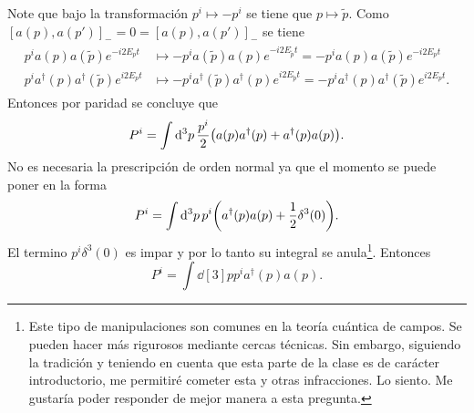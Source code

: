 \documentclass{article}
\begin{document}
Note que bajo la transformación $p^i\mapsto-p^i$ se tiene que $p\mapsto\tilde{p}$. Como $[a(p),a(p')]_-=0=[a(p),a(p')]_-$ se tiene
\begin{align}
\begin{split}
p^ia(p)a(\tilde{p})e^{-i2E_pt}&\mapsto-p^ia(\tilde{p})a(p)e^{-i2E_{\tilde{p}}t}=-p^ia(p)a(\tilde{p})e^{-i2E_pt}\\
p^ia^\dagger(p)a^\dagger(\tilde{p})e^{i2E_pt}&\mapsto-p^ia^\dagger(\tilde{p})a^\dagger(p)e^{i2E_{\tilde{p}}t}=-p^ia^\dagger(p)a^\dagger(\tilde{p})e^{i2E_pt}.
\end{split}
\end{align} 
Entonces por paridad se concluye que
\begin{equation}
P^i=\int\dd[3]{p}\frac{p^i}{2}\qty(a(p)a^\dagger(p)+a^\dagger(p)a(p)).
\end{equation}
No es necesaria la prescripción de orden normal  ya que el momento se puede poner en la forma
\begin{equation}
P^i=\int\dd[3]{p}p^i\qty(a^\dagger(p)a(p)+\frac{1}{2}\delta^3(0)).
\end{equation}
El termino $p^i\delta^3(0)$ es impar y por lo tanto su integral se anula\footnote{Este tipo de manipulaciones son comunes en la teoría cuántica de campos. Se pueden hacer más rigurosos mediante cercas técnicas. Sin embargo, siguiendo la tradición y teniendo en cuenta que esta parte de la clase es de carácter introductorio, me permitiré cometer esta y otras infracciones. Lo siento. Me gustaría poder responder de mejor manera a esta pregunta.}. Entonces
\begin{equation}
P^i=\int\dd[3]{p}p^ia^\dagger(p) a(p).
\end{equation}
\end{document}
